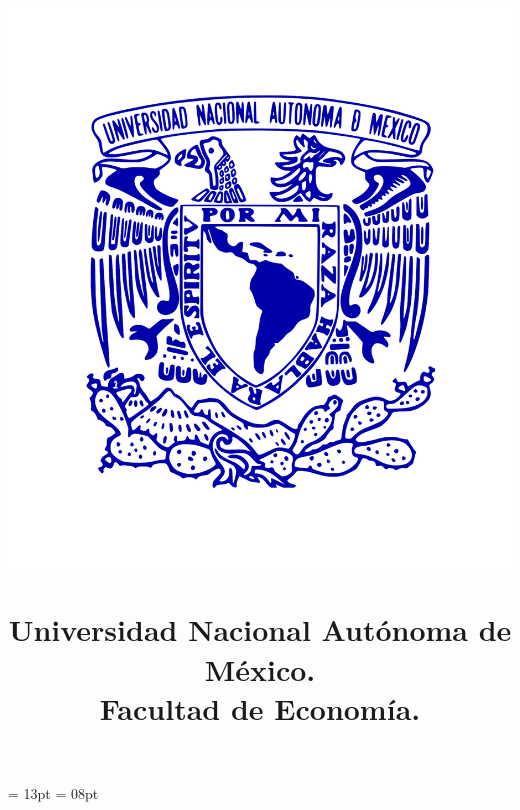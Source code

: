 \usepackage[pages=some,	scale=1.34]{background}

\parindent = 13pt
\parskip = 08pt
\setlength{\columnsep}{41pt}
\setlength{\columnseprule}{0.68pt}
\newcommand{\latexcolumnseprulecolor}{\color{blue}}
\everymath{\displaystyle}
\linespread{1.1213}
\color{darkgray}

\title{\vspace{-21pt} \hspace*{08pt}
				\begin{minipage}[t][00pt][c]{4.1cm}\hspace*{-15pt}
					\includegraphics[width=\linewidth]{Escudo-UNAM-Azul}
				\end{minipage}\hfill
				\begin{minipage}[t][00pt][t]{11cm}
					\centering \vspace{-34pt}
					{\large \textbf{Universidad Nacional Autónoma de México.}}\\ \vspace{05pt}
					{\normalsize \textbf{Facultad de Economía.}\\ \vspace{05pt}
}
\end{minipage}}
